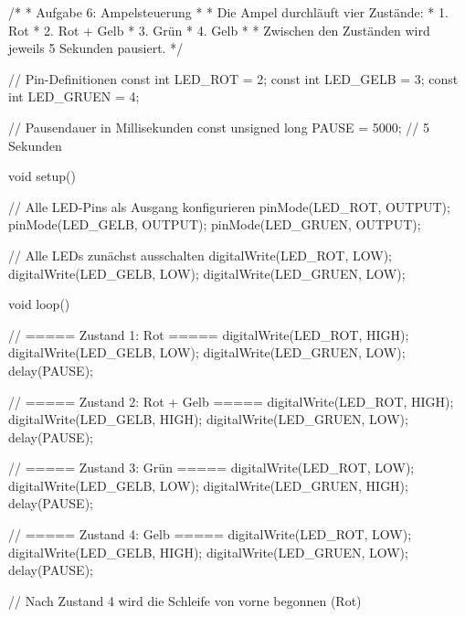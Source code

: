 /*
 * Aufgabe 6: Ampelsteuerung
 * 
 * Die Ampel durchläuft vier Zustände:
 * 1. Rot
 * 2. Rot + Gelb
 * 3. Grün
 * 4. Gelb
 * 
 * Zwischen den Zuständen wird jeweils 5 Sekunden pausiert.
 */

// Pin-Definitionen
const int LED_ROT   = 2;
const int LED_GELB  = 3;
const int LED_GRUEN = 4;

// Pausendauer in Millisekunden
const unsigned long PAUSE = 5000;  // 5 Sekunden

void setup() {
    // Alle LED-Pins als Ausgang konfigurieren
    pinMode(LED_ROT, OUTPUT);
    pinMode(LED_GELB, OUTPUT);
    pinMode(LED_GRUEN, OUTPUT);
    
    // Alle LEDs zunächst ausschalten
    digitalWrite(LED_ROT, LOW);
    digitalWrite(LED_GELB, LOW);
    digitalWrite(LED_GRUEN, LOW);
}

void loop() {
    // ===== Zustand 1: Rot =====
    digitalWrite(LED_ROT, HIGH);
    digitalWrite(LED_GELB, LOW);
    digitalWrite(LED_GRUEN, LOW);
    delay(PAUSE);
    
    // ===== Zustand 2: Rot + Gelb =====
    digitalWrite(LED_ROT, HIGH);
    digitalWrite(LED_GELB, HIGH);
    digitalWrite(LED_GRUEN, LOW);
    delay(PAUSE);
    
    // ===== Zustand 3: Grün =====
    digitalWrite(LED_ROT, LOW);
    digitalWrite(LED_GELB, LOW);
    digitalWrite(LED_GRUEN, HIGH);
    delay(PAUSE);
    
    // ===== Zustand 4: Gelb =====
    digitalWrite(LED_ROT, LOW);
    digitalWrite(LED_GELB, HIGH);
    digitalWrite(LED_GRUEN, LOW);
    delay(PAUSE);
    
    // Nach Zustand 4 wird die Schleife von vorne begonnen (Rot)
}
